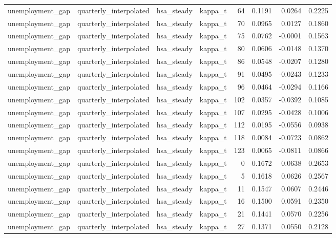 \begin{tabular}{llllrrrr}
unemployment\_gap & quarterly\_interpolated & hsa\_steady & kappa\_t & 64 & 0.1191 & 0.0264 & 0.2225 \\
unemployment\_gap & quarterly\_interpolated & hsa\_steady & kappa\_t & 70 & 0.0965 & 0.0127 & 0.1860 \\
unemployment\_gap & quarterly\_interpolated & hsa\_steady & kappa\_t & 75 & 0.0762 & -0.0001 & 0.1563 \\
unemployment\_gap & quarterly\_interpolated & hsa\_steady & kappa\_t & 80 & 0.0606 & -0.0148 & 0.1370 \\
unemployment\_gap & quarterly\_interpolated & hsa\_steady & kappa\_t & 86 & 0.0548 & -0.0207 & 0.1280 \\
unemployment\_gap & quarterly\_interpolated & hsa\_steady & kappa\_t & 91 & 0.0495 & -0.0243 & 0.1233 \\
unemployment\_gap & quarterly\_interpolated & hsa\_steady & kappa\_t & 96 & 0.0464 & -0.0294 & 0.1166 \\
unemployment\_gap & quarterly\_interpolated & hsa\_steady & kappa\_t & 102 & 0.0357 & -0.0392 & 0.1085 \\
unemployment\_gap & quarterly\_interpolated & hsa\_steady & kappa\_t & 107 & 0.0295 & -0.0428 & 0.1006 \\
unemployment\_gap & quarterly\_interpolated & hsa\_steady & kappa\_t & 112 & 0.0195 & -0.0556 & 0.0938 \\
unemployment\_gap & quarterly\_interpolated & hsa\_steady & kappa\_t & 118 & 0.0084 & -0.0723 & 0.0862 \\
unemployment\_gap & quarterly\_interpolated & hsa\_steady & kappa\_t & 123 & 0.0065 & -0.0811 & 0.0866 \\
unemployment\_gap & quarterly\_interpolated & hsa\_steady & kappa\_t & 0 & 0.1672 & 0.0638 & 0.2653 \\
unemployment\_gap & quarterly\_interpolated & hsa\_steady & kappa\_t & 5 & 0.1618 & 0.0626 & 0.2567 \\
unemployment\_gap & quarterly\_interpolated & hsa\_steady & kappa\_t & 11 & 0.1547 & 0.0607 & 0.2446 \\
unemployment\_gap & quarterly\_interpolated & hsa\_steady & kappa\_t & 16 & 0.1500 & 0.0591 & 0.2350 \\
unemployment\_gap & quarterly\_interpolated & hsa\_steady & kappa\_t & 21 & 0.1441 & 0.0570 & 0.2256 \\
unemployment\_gap & quarterly\_interpolated & hsa\_steady & kappa\_t & 27 & 0.1371 & 0.0550 & 0.2128 \\

\end{tabular}
